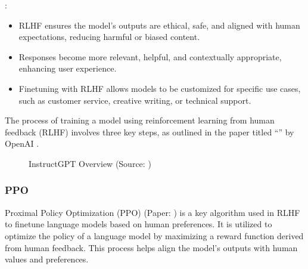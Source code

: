 \documentclass[letterpaper,11pt,english]{sphinxmanual}
\begin{document}
\sphinxAtStartPar
{}:
\begin{itemize}
\item {} 
\sphinxAtStartPar
RLHF ensures the model’s outputs are ethical, safe, and aligned with human
expectations, reducing harmful or biased content.

\item {} 
\sphinxAtStartPar
Responses become more relevant, helpful, and contextually appropriate,
enhancing user experience.

\item {} 
\sphinxAtStartPar
Fine\sphinxhyphen{}tuning with RLHF allows models to be customized for specific use cases,
such as customer service, creative writing, or technical support.

\end{itemize}

\sphinxAtStartPar
The process of training a model using reinforcement learning from human
feedback (RLHF) involves three key steps, as outlined in the paper
titled “” by OpenAI .

\begin{figure}[htbp]
\centering
\capstart

\noindent{}
\caption{InstructGPT Overview (Source: )}\label{\detokenize{finetuning:id11}}\end{figure}


\subsubsection{PPO}
\label{\detokenize{finetuning:ppo}}
\sphinxAtStartPar
Proximal Policy Optimization (PPO) (Paper: ) is a key algorithm
used in RLHF to fine\sphinxhyphen{}tune language models based on human preferences. It
is utilized to optimize the policy of a language model by maximizing a
reward function derived from human feedback. This process helps align
the model’s outputs with human values and preferences. 

\sphinxAtStartPar
{}
\end{document}
